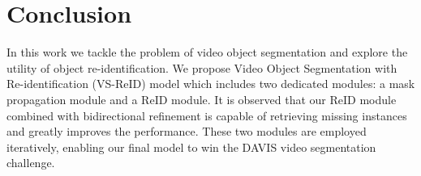 
\section{Conclusion}

In this work we tackle the problem of video object segmentation and explore the utility of object re-identification. 
We propose Video Object Segmentation with Re-identification (VS-ReID) model which includes two dedicated modules: a mask propagation module and a ReID module.
It is observed that our ReID module combined with bidirectional refinement is capable of retrieving missing instances and greatly improves the performance.
These two modules are employed iteratively, enabling our final model to win the DAVIS video segmentation challenge.

